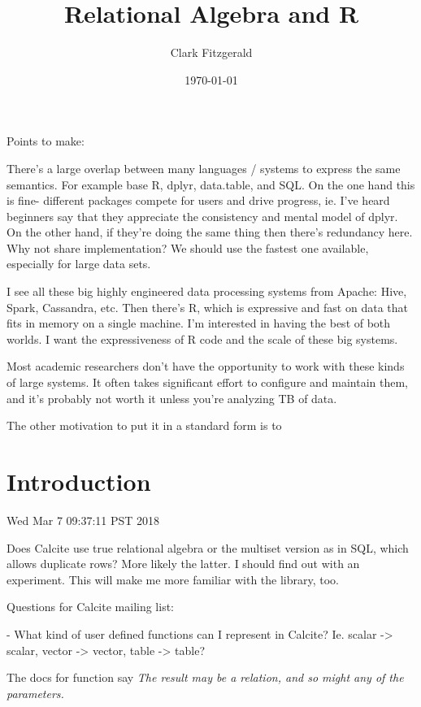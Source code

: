 \documentclass[12pt]{article}
\begin{document}
\title{Relational Algebra and R}
\date{\today}
\author{Clark Fitzgerald}
\maketitle

Points to make:

There's a large overlap between many languages / systems to express the
same semantics. For example base R, dplyr, data.table, and SQL.
On the one hand this is fine- different packages compete for users and
drive progress, ie. I've heard beginners say that they appreciate the
consistency and mental model of dplyr.  On the other hand, if they're doing
the same thing then there's redundancy here.  Why not share implementation?
We should use the fastest one available, especially for large data sets.

I see all these big highly engineered data processing systems
from Apache: Hive, Spark, Cassandra, etc. Then there's R, which is
expressive and fast on data that fits in memory on a single machine.
I'm interested in having the best of both worlds. I want the expressiveness
of R code and the scale of these big systems.

Most academic researchers don't have the opportunity to work with
these kinds of large systems. It often takes significant effort to
configure and maintain them, and it's probably not worth it unless you're
analyzing TB of data.

The other motivation to put it in a standard form is to 

\section{Introduction}

Wed Mar  7 09:37:11 PST 2018

Does Calcite use true relational algebra or the multiset version as in SQL,
which allows duplicate rows? More likely the latter. I should find out
with an experiment. This will make me more familiar with the library, too.

Questions for Calcite mailing list:

- What kind of user defined functions can I represent in Calcite? Ie.
scalar -> scalar, vector -> vector, table -> table?

The docs for function say \emph{The result may be a relation, and so might
any of the parameters.}
\end{document}
